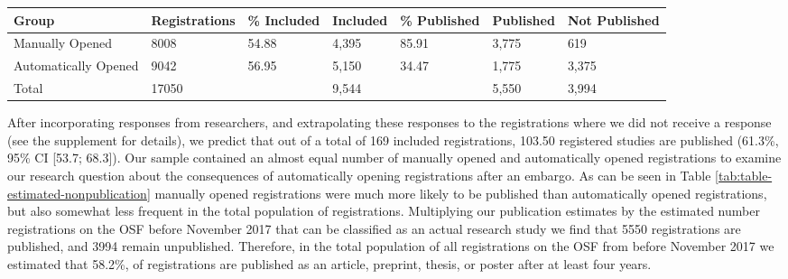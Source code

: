\documentclass[
  ,jou, a4paper,floatsintext]{apa6}
\begin{document}
\begin{table*}[tbp]

\begin{center}
\begin{threeparttable}

\caption{\label{tab:table-estimated-nonpublication}Estimated number of published and unpublished studies registered on the OSF before November 2017.}

\begin{tabular}{lllllll}
\toprule
Group & \multicolumn{1}{c}{Registrations} & \multicolumn{1}{c}{\% Included} & \multicolumn{1}{c}{Included} & \multicolumn{1}{c}{\% Published} & \multicolumn{1}{c}{Published} & \multicolumn{1}{c}{Not Published}\\
\midrule
Manually Opened & 8008 & 54.88 & 4,395 & 85.91 & 3,775 & 619\\
Automatically Opened & 9042 & 56.95 & 5,150 & 34.47 & 1,775 & 3,375\\
Total & 17050 &  & 9,544 &  & 5,550 & 3,994\\
\bottomrule
\end{tabular}

\end{threeparttable}
\end{center}

\end{table*}

After incorporating responses from researchers, and extrapolating these responses to the registrations where we did not receive a response (see the supplement for details), we predict that out of a total of 169 included registrations, 103.50 registered studies are published (61.3\%, 95\% CI {[}53.7; 68.3{]}). Our sample contained an almost equal number of manually opened and automatically opened registrations to examine our research question about the consequences of automatically opening registrations after an embargo. As can be seen in Table \ref{tab:table-estimated-nonpublication} manually opened registrations were much more likely to be published than automatically opened registrations, but also somewhat less frequent in the total population of registrations. Multiplying our publication estimates by the estimated number registrations on the OSF before November 2017 that can be classified as an actual research study we find that 5550 registrations are published, and 3994 remain unpublished. Therefore, in the total population of all registrations on the OSF from before November 2017 we estimated that 58.2\%, of registrations are published as an article, preprint, thesis, or poster after at least four years.
\end{document}

